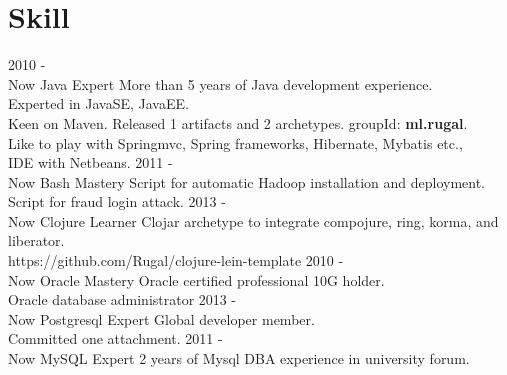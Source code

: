 \documentclass[]{friggeri-cv} %
\begin{document}
\section{Skill}
\begin{entrylist}
	\entry
	{2010 - \\ Now}
	{Java}
	{Expert}
	{
		More than 5 years of Java development experience.\\
		Experted in JavaSE, JavaEE.\\
		Keen on Maven. Released 1 artifacts and 2 archetypes. groupId: \textbf{ml.rugal}.\\
		Like to play with Springmvc, Spring frameworks, Hibernate, Mybatis etc.,\\
		IDE with Netbeans.
	}
	\entry
	{2011 - \\ Now}
	{Bash}
	{Mastery}
	{
		Script for automatic Hadoop installation and deployment.\\
		Script for fraud login attack.
	}
	\entry
	{2013 - \\ Now}
	{Clojure}
	{Learner}
	{
		Clojar archetype to integrate compojure, ring, korma, and liberator.\\
		https://github.com/Rugal/clojure-lein-template
	}
	\entry
	{2010 - \\ Now}
	{Oracle}
	{Mastery}
	{
		Oracle certified professional 10G holder.\\
		Oracle database administrator
	}
	\entry
	{2013 - \\ Now}
	{Postgresql}
	{Expert}
	{
		Global developer member.\\
		Committed one attachment.
	}
	\entry
	{2011 - \\ Now}
	{MySQL}
	{Expert}
	{
		2 years of Mysql DBA experience in university forum.
	}
\end{entrylist}
\newpage
\end{document}
